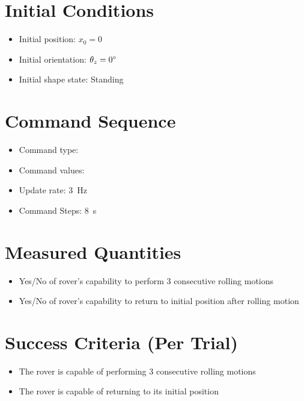 \documentclass[11pt]{article}
\begin{document}
\section*{Initial Conditions}
\begin{itemize}[noitemsep]
    \item Initial position: $x_0 = 0$
    \item Initial orientation: $\theta_z = 0 {\degree}$
    \item Initial shape state: Standing
\end{itemize}

\section*{Command Sequence}
\begin{itemize}[noitemsep]
    \item Command type: \underline{\hspace{5 cm}}
    \item Command values: \underline{\hspace{5 cm}}
    \item Update rate: 3~Hz
    \item Command Steps: 8~s
\end{itemize}

\section*{Measured Quantities}
\begin{itemize}[noitemsep]
    \item Yes/No of rover's capability to perform 3 consecutive rolling motions
    \item Yes/No of rover's capability to return to initial position after rolling motion
\end{itemize}

\section*{Success Criteria (Per Trial)}
\begin{itemize}[noitemsep]
    \item The rover is capable of performing 3 consecutive rolling motions
    \item The rover is capable of returning to its initial position
\end{itemize}
\end{document}
